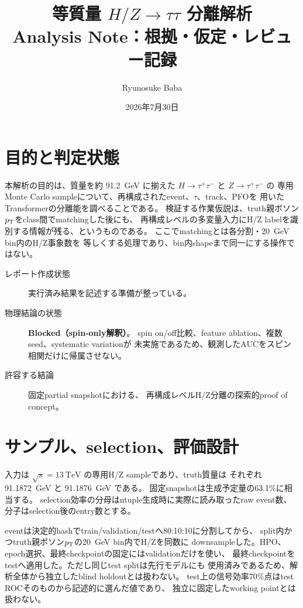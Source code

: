 \documentclass[xelatex,ja=standard,a4paper,10pt]{bxjsarticle}
\title{等質量 \(H/Z\rightarrow\tau\tau\) 分離解析\\
\large Analysis Note：根拠・仮定・レビュー記録}
\author{Ryunosuke Baba}
\date{2026年7月30日}
\begin{document}
\maketitle

\section{目的と判定状態}

本解析の目的は、質量を約 \SI{91.2}{\GeV} に揃えた
\(H\rightarrow\tau^+\tau^-\) と \(Z\rightarrow\tau^+\tau^-\) の
専用Monte Carlo sampleについて、再構成されたevent、\(\tau\)、track、PFOを
用いたTransformerの分離能を調べることである。
検証する作業仮説は、truth親ボソン\(p_{\mathrm{T}}\)をclass間でmatchingした後にも、
再構成レベルの多変量入力にH/Z labelを識別する情報が残る、というものである。
ここでmatchingとは各分割・\SI{20}{\GeV} bin内のH/Z事象数を
等しくする処理であり、bin内shapeまで同一にする操作ではない。

\begin{description}
  \item[レポート作成状態] 実行済み結果を記述する準備が整っている。
  \item[物理結論の状態] \textbf{Blocked（spin-only解釈）}。
    spin on/off比較、feature ablation、複数seed、systematic variationが
    未実施であるため、観測したAUCをスピン相関だけに帰属させない。
  \item[許容する結論] 固定partial snapshotにおける、
    再構成レベルH/Z分離の探索的proof of concept。
\end{description}

\section{サンプル、selection、評価設計}

入力は \(\sqrt{s}=\SI{13}{\TeV}\) の専用H/Z sampleであり、truth質量は
それぞれ \SI{91.1872}{\GeV} と \SI{91.1876}{\GeV} である。
固定snapshotは生成予定量の63.1\%に相当する。
selection効率の分母はntuple生成時に実際に読み取ったraw event数、
分子はselection後のentry数とする。

eventは決定的hashでtrain/validation/testへ80:10:10に分割してから、
split内かつtruth親ボソン\(p_{\mathrm{T}}\)の\SI{20}{\GeV} bin内でH/Zを同数に
downsampleした。HPO、epoch選択、最終checkpointの固定にはvalidationだけを使い、
最終checkpointをtestへ適用した。ただし同じtest splitは先行モデルにも
使用済みであるため、解析全体から独立したblind holdoutとは扱わない。
test上の信号効率70\%点はtest ROCそのものから記述的に選んだ値であり、
独立に固定したworking pointとは扱わない。
\end{document}
